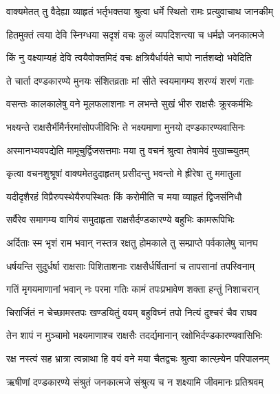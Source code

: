 
\twolineshloka
{वाक्यमेतत् तु वैदेह्या व्याहृतं भर्तृभक्तया}
{श्रुत्वा धर्मे स्थितो रामः प्रत्युवाचाथ जानकीम्} %

\twolineshloka
{हितमुक्तं त्वया देवि स्निग्धया सदृशं वचः}
{कुलं व्यपदिशन्त्या च धर्मज्ञे जनकात्मजे} %

\twolineshloka
{किं नु वक्ष्याम्यहं देवि त्वयैवोक्तमिदं वचः}
{क्षत्रियैर्धार्यते चापो नार्तशब्दो भवेदिति} %

\twolineshloka
{ते चार्ता दण्डकारण्ये मुनयः संशितव्रताः}
{मां सीते स्वयमागम्य शरण्यं शरणं गताः} %

\twolineshloka
{वसन्तः कालकालेषु वने मूलफलाशनाः}
{न लभन्ते सुखं भीरु राक्षसैः क्रूरकर्मभिः} %

\twolineshloka
{भक्ष्यन्ते राक्षसैर्भीमैर्नरमांसोपजीविभिः}
{ते भक्ष्यमाणा मुनयो दण्डकारण्यवासिनः} %

\twolineshloka
{अस्मानभ्यवपद्येति मामूचुर्द्विजसत्तमाः}
{मया तु वचनं श्रुत्वा तेषामेवं मुखाच्च्युतम्} %

\twolineshloka
{कृत्वा वचनशुश्रूषां वाक्यमेतदुदाहृतम्}
{प्रसीदन्तु भवन्तो मे ह्रीरेषा तु ममातुला} %

\twolineshloka
{यदीदृशैरहं विप्रैरुपस्थेयैरुपस्थितः}
{किं करोमीति च मया व्याहृतं द्विजसंनिधौ} %

\twolineshloka
{सर्वैरेव समागम्य वागियं समुदाहृता}
{राक्षसैर्दण्डकारण्ये बहुभिः कामरूपिभिः} %

\twolineshloka
{अर्दिताः स्म भृशं राम भवान् नस्तत्र रक्षतु}
{होमकाले तु सम्प्राप्ते पर्वकालेषु चानघ} %

\twolineshloka
{धर्षयन्ति सुदुर्धर्षा राक्षसाः पिशिताशनाः}
{राक्षसैर्धर्षितानां च तापसानां तपस्विनाम्} %

\twolineshloka
{गतिं मृगयमाणानां भवान् नः परमा गतिः}
{कामं तपःप्रभावेण शक्ता हन्तुं निशाचरान्} %

\twolineshloka
{चिरार्जितं न चेच्छामस्तपः खण्डयितुं वयम्}
{बहुविघ्नं तपो नित्यं दुश्चरं चैव राघव} %

\twolineshloka
{तेन शापं न मुञ्चामो भक्ष्यमाणाश्च राक्षसैः}
{तदर्द्यमानान् रक्षोभिर्दण्डकारण्यवासिभिः} %

\twolineshloka
{रक्ष नस्त्वं सह भ्रात्रा त्वन्नाथा हि वयं वने}
{मया चैतद्वचः श्रुत्वा कात्स्न्र्येन परिपालनम्} %

\twolineshloka
{ऋषीणां दण्डकारण्ये संश्रुतं जनकात्मजे}
{संश्रुत्य च न शक्ष्यामि जीवमानः प्रतिश्रवम्} %

